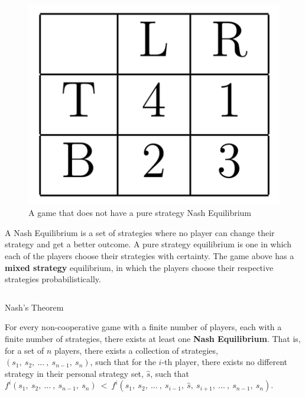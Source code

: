 \documentclass[final]{beamer}
\newlength{\onecolwid}
\newlength{\twocolwid}
\begin{document}
\begin{frame}[t]
\begin{columns}[t]
\begin{column}{\twocolwid}
\begin{columns}[t, totalwidth=\twocolwid]
\begin{column}{\onecolwid}

\begin{figure}
\includegraphics[width=0.4\linewidth]{payout.png}
\caption{A game that does not have a pure strategy Nash Equilibrium}
\end{figure}

{\selectfont
A Nash Equilibrium is a set of strategies where no player can change their strategy and get a better outcome. A pure strategy equilibrium is one in which each of the players choose their strategies with certainty. The game above has a \textbf{mixed strategy} equilibrium, in which the players choose their respective strategies probabilistically.
\vspace{10mm}
}





\end{column} %




\end{columns} %



\begin{alertblock}{Nash's Theorem}

For every non-cooperative game with a finite number of players, each with a finite number of strategies, there exists at least one \textbf{Nash Equilibrium}. That is, for a set of $n$ players, there exists a collection of strategies, $(s_1, \ s_2, \ ... \ , \ s_{n-1}, \ s_n)$, such that for the $i$-th player, there exists no different strategy in their personal strategy set, $\hat{s}$, such that $f^i(s_1, \ s_2, \ ... \ , \ s_{n-1}, \ s_n) \ < \ f^i(s_1, \ s_2, \ ... \ , \ s_{i-1}, \ \hat{s}, \ s_{i+1}, \ ... \ , \ s_{n-1}, \ s_n)$.


\end{alertblock}
\end{column}
\end{columns}
\end{frame}
\end{document}
